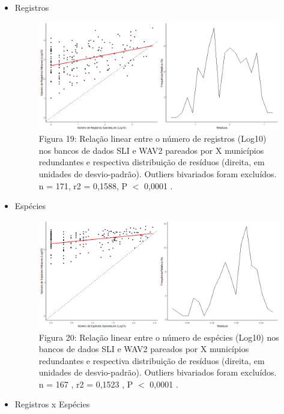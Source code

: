 \begin{itemize}
\begin{itemize}

\item Registros

\begin{figure}[h!]
\centering
\includegraphics[width = 12cm]{Imagens/4113.png}
\\{\scriptsize  Figura 19: Relação linear entre o número de registros (Log10) nos bancos de dados SLI e WAV2 pareados por X municípios redundantes e respectiva distribuição de resíduos (direita, em unidades de desvio-padrão). Outliers bivariados foram excluídos. n = 171, r2 = 0,1588, P $<$ 0,0001 .}
\end{figure}

\newpage

\item Espécies

\begin{figure}[h!]
\centering
\includegraphics[width = 12cm]{Imagens/4213.png}
\\{\scriptsize Figura 20: Relação linear entre o número de espécies (Log10) nos bancos de dados SLI e WAV2 pareados por X municípios redundantes e respectiva distribuição de resíduos (direita, em unidades de desvio-padrão). Outliers bivariados foram excluídos. n = 167 , r2 = 0,1523 , P $<$ 0,0001 .}
\end{figure}

\item Registros x Espécies


\end{itemize}
\end{itemize}
